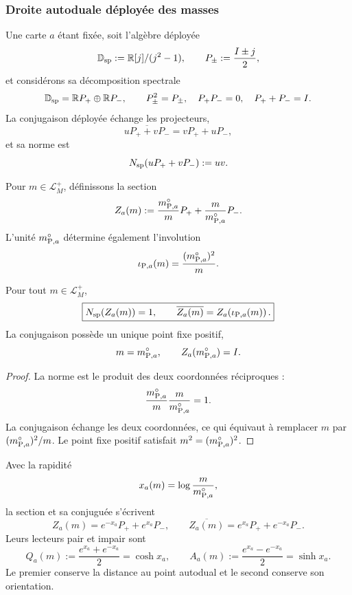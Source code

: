 \subsubsection{Droite autoduale déployée des masses}

Une carte \(a\) étant fixée, soit l’algèbre déployée
\[
 \mathbb D_{\rm sp}:=\mathbb R[j]/(j^2-1),
 \qquad
 P_\pm:=\frac{I\pm j}{2},
\]
et considérons sa décomposition spectrale
\[
 \mathbb D_{\rm sp}
 =\mathbb R P_+\oplus\mathbb R P_-,
 \qquad
 P_\pm^2=P_\pm,\quad
 P_+P_-=0,\quad
 P_++P_-=I.
\]
La conjugaison déployée échange les projecteurs,
\[
 \overline{uP_++vP_-}=vP_++uP_-,
\]
et sa norme est
\[
 N_{\rm sp}(uP_++vP_-):=uv.
\]

Pour \(m\in\mathcal L_M^+\), définissons la section
\begin{equation}
 Z_a(m)
 :=\frac{m_{{\rm P},a}^{\circ}}{m}P_+
   +\frac{m}{m_{{\rm P},a}^{\circ}}P_- .
 \label{eq:planck-ct108-seccion-partida-masa-rev3}
\end{equation}
L’unité \(m_{{\rm P},a}^{\circ}\) détermine également l’involution
\begin{equation}
 \iota_{{\rm P},a}(m)
 =\frac{(m_{{\rm P},a}^{\circ})^2}{m}.
 \label{eq:planck-ct108-involucion-masas-rev3}
\end{equation}

\begin{theorem}
\label{thm:planck-ct108-recta-partida-masa-rev3}
Pour tout \(m\in\mathcal L_M^+\),
\begin{equation}
 \boxed{
 N_{\rm sp}(Z_a(m))=1,
 \qquad
 \overline{Z_a(m)}
 =Z_a\!\left(\iota_{{\rm P},a}(m)\right).}
 \label{eq:planck-ct108-norma-conjugacion-rev3}
\end{equation}
La conjugaison possède un unique point fixe positif,
\[
 m=m_{{\rm P},a}^{\circ},
 \qquad
 Z_a(m_{{\rm P},a}^{\circ})=I.
\]
\end{theorem}

\begin{proof}
La norme est le produit des deux coordonnées réciproques :
\[
 \frac{m_{{\rm P},a}^{\circ}}m
 \frac m{m_{{\rm P},a}^{\circ}}=1.
\]
La conjugaison échange les deux coordonnées, ce qui équivaut à remplacer
\(m\) par \((m_{{\rm P},a}^{\circ})^2/m\). Le point fixe positif satisfait
\(m^2=(m_{{\rm P},a}^{\circ})^2\).
\end{proof}

Avec la rapidité
\begin{equation}
 x_a(m)=\log\frac{m}{m_{{\rm P},a}^{\circ}},
 \label{eq:planck-ct108-rapidez-masa-rev3}
\end{equation}
la section et sa conjuguée s’écrivent
\[
 Z_a(m)=e^{-x_a}P_++e^{x_a}P_-,
 \qquad
 \overline{Z_a(m)}
 =e^{x_a}P_++e^{-x_a}P_-.
\]
Leurs lecteurs pair et impair sont
\begin{equation}
 Q_a(m):=\frac{e^{x_a}+e^{-x_a}}2=\cosh x_a,
 \qquad
 A_a(m):=\frac{e^{x_a}-e^{-x_a}}2=\sinh x_a.
 \label{eq:planck-ct108-lectores-par-impar-rev3}
\end{equation}
Le premier conserve la distance au point autodual et le second conserve son
orientation.

